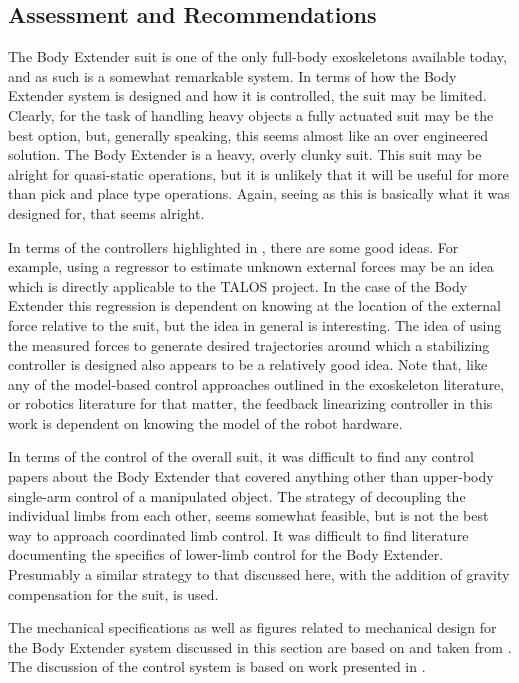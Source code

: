 \begin{refsection}
 
\subsection{Assessment and Recommendations}

The Body Extender suit is one of the only full-body exoskeletons available today, and as such is a somewhat remarkable system. In terms of how the Body Extender system is designed and how it is controlled, the suit may be limited. Clearly, for the task of handling heavy objects a fully actuated suit may be the best option, but, generally speaking, this seems almost like an over engineered solution.  The Body Extender is a heavy, overly clunky suit.  This suit may be alright for quasi-static operations, but it is unlikely that it will be useful for more than pick and place type operations.  Again, seeing as this is basically what it was designed for, that seems alright.

In terms of the controllers highlighted in \cite{body_control_2012}, there are some good ideas.  For example, using a regressor to estimate unknown external forces may be an idea which is directly applicable to the TALOS project.  In the case of the Body Extender this regression is dependent on knowing at the location of the external force  relative to the suit, but the idea in general is interesting.  The idea of using the measured forces to generate desired trajectories around which a stabilizing controller is designed also appears to be a relatively good idea.  Note that, like any of the model-based control approaches outlined in the exoskeleton literature, or robotics literature for that matter, the feedback linearizing controller in this work is dependent on knowing the model of the robot hardware.  

In terms of the control of the overall suit, it was difficult to find any control papers about the Body Extender that covered anything other than upper-body single-arm control of a manipulated object.  The strategy of decoupling the individual limbs from each other, seems somewhat feasible, but is not the best way to approach coordinated limb control.  It was difficult to find literature documenting the specifics of lower-limb control for the Body Extender.  Presumably a similar strategy to that discussed here, with the addition of gravity compensation for the suit, is used.

 The mechanical specifications as well as figures related to mechanical design for the Body Extender system discussed in this section are based on and taken from \cite{body_design_2011}.  The discussion of the control system is based on work presented in \cite{body_control_2012}.

\printbibliography[heading=subbibliography]

\end{refsection}
  
